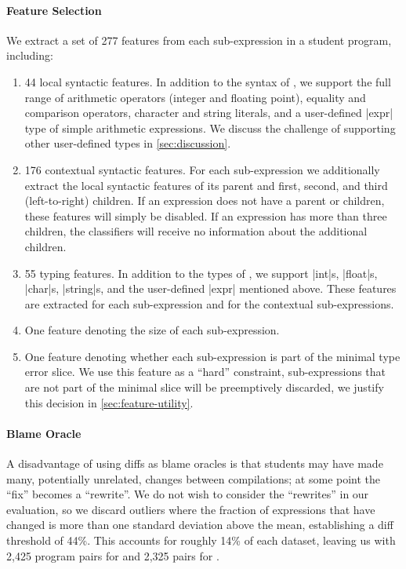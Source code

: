 \paragraph{Feature Selection}
We extract a set of 277 features from each sub-expression in a student
program, including:
%
\begin{enumerate}
\item 44 local syntactic features. In addition to the syntax of \lang,
  we support the full range of arithmetic operators (integer and
  floating point), equality and comparison operators, character and
  string literals, and a user-defined |expr| type of simple arithmetic
  expressions. We discuss the challenge of supporting other
  user-defined types in \autoref{sec:discussion}.
\item 176 contextual syntactic features. For each sub-expression we
  additionally extract the local syntactic features of its parent and
  first, second, and third (left-to-right) children. If an expression
  does not have a parent or children, these features will simply be
  disabled. If an expression has more than three children, the
  classifiers will receive no information about the additional
  children.
\item 55 typing features. In addition to the types of \lang, we support
  |int|s, |float|s, |char|s, |string|s, and the user-defined |expr|
  mentioned above. These features are extracted for each sub-expression
  and for the contextual sub-expressions.
\item One feature denoting the size of each sub-expression.
\item One feature denoting whether each sub-expression is part of the
  minimal type error slice. We use this feature as a ``hard''
  constraint, sub-expressions that are not part of the minimal slice
  will be preemptively discarded, we justify this decision in
  \autoref{sec:feature-utility}.
\end{enumerate}

\paragraph{Blame Oracle}

A disadvantage of using diffs as blame oracles is that students may have
made many, potentially unrelated, changes between compilations; at some
point the ``fix'' becomes a ``rewrite''.
%
We do not wish to consider the ``rewrites'' in our evaluation, so we
discard outliers where the fraction of expressions that have changed is
more than one standard deviation above the mean, establishing a diff
threshold of 44\%.
%
This accounts for roughly 14\% of each dataset, leaving us with
2,425 program pairs for \SPRING and 2,325 pairs for \FALL.

